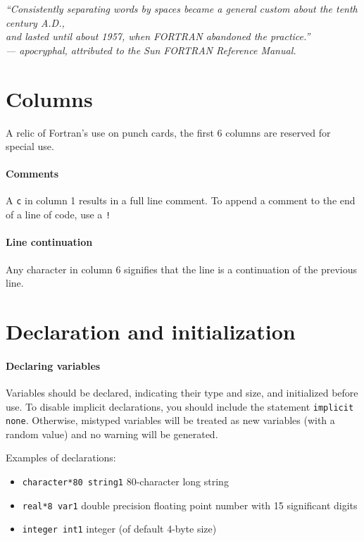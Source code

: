 \documentclass[10pt,letterpaper,oneside]{report}
\begin{document}
\begin{center}
\emph{“Consistently separating words by spaces became a general custom about the tenth century A.D., \\ and lasted until about 1957, when FORTRAN abandoned the practice.” \\
— apocryphal, attributed to the Sun FORTRAN Reference Manual.}
\end{center}

\section{Columns}
A relic of Fortran's use on punch cards, the first 6 columns are reserved for special use.  

\paragraph{Comments}
A \texttt{c} in column 1 results in a full line comment.  To append a comment to the end of a line of code, use a \texttt{!}

\paragraph{Line continuation}
Any character in column 6 signifies that the line is a continuation of the previous line. 

\section{Declaration and initialization}
\paragraph{Declaring variables}
Variables should be declared, indicating their type and size, and initialized before use.  To disable implicit declarations, you should include the statement \texttt{implicit none}.  Otherwise, mistyped variables will be treated as new variables (with a random value) and no warning will be generated.  

Examples of declarations: 
\begin{itemize}
\item \texttt{character*80 string1} 80-character long string
\item \texttt{real*8 var1} double precision floating point number with 15 significant digits
\item \texttt{integer int1} integer (of default 4-byte size)
\end{itemize}
\end{document}
